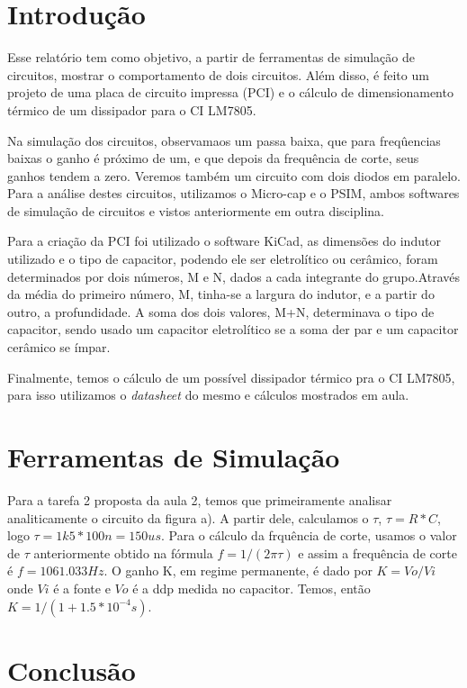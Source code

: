 \chapter*{Introdução}

Esse relatório tem como objetivo, a partir de ferramentas de simulação de circuitos, mostrar o comportamento de dois circuitos. Além disso, é feito um projeto de uma placa de circuito impressa (PCI) e o cálculo de dimensionamento térmico de um dissipador para o CI LM7805. 

Na simulação dos circuitos, observamaos um passa baixa, que para freqûencias baixas o ganho é próximo de um, e que depois da frequência de corte, seus ganhos tendem a zero. Veremos também um circuito com dois diodos em paralelo. Para a análise destes circuitos, utilizamos o Micro-cap e o PSIM, ambos softwares de simulação de circuitos e vistos anteriormente em outra disciplina.

Para a criação da PCI foi utilizado o software KiCad, as dimensões do indutor utilizado e o tipo de capacitor, podendo ele ser eletrolítico ou cerâmico, foram determinados por dois números, M e N, dados a cada integrante do grupo.Através da média do primeiro número, M, tinha-se a largura do indutor, e a partir do outro, a profundidade. A soma dos dois valores, M+N, determinava o tipo de capacitor, sendo usado um capacitor eletrolítico se a soma der par e um capacitor cerâmico se ímpar.

Finalmente, temos o cálculo de um possível dissipador térmico pra o CI LM7805, para isso utilizamos o \textit{datasheet} do mesmo e cálculos mostrados em aula. 

\chapter{Ferramentas de Simulação}\label{cap_simul}
    Para a tarefa 2 proposta da aula 2, temos que primeiramente analisar analiticamente o circuito da figura a). A partir dele, calculamos o $\tau$, $\tau = R*C $, logo $\tau = 1k5 * 100n = 150us$. Para o cálculo da frquência de corte, usamos o valor de $\tau$ anteriormente obtido na fórmula $f = 1/(2\pi\tau)$ e assim a frequência de corte é $f = 1061.033 Hz$. O ganho K, em regime permanente, é dado por $K = Vo/Vi$ onde $Vi$ é a fonte e $Vo$ é a ddp medida no capacitor. Temos, então $K = 1/(1 + 1.5*10^{-4}s)$.
    
    
    
    
    
    
    
\chapter{Conclusão}\label{cap_concl}



%
%
